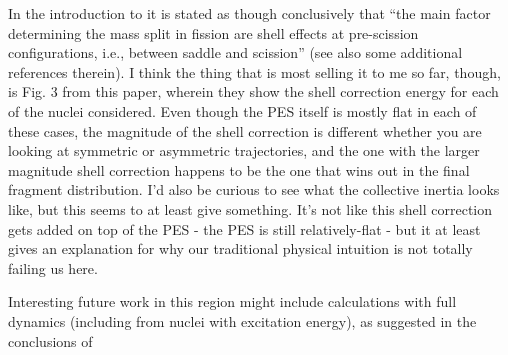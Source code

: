 In the introduction to \cite{Mcdonnell2014} it is stated as though conclusively that ``the main factor determining the mass split in fission are shell effects at pre-scission configurations, i.e., between saddle and scission'' (see also some additional references therein). I think the thing that is most selling it to me so far, though, is Fig. 3 from this paper, wherein they show the shell correction energy for each of the nuclei considered. Even though the PES itself is mostly flat in each of these cases, the magnitude of the shell correction is different whether you are looking at symmetric or asymmetric trajectories, and the one with the larger magnitude shell correction happens to be the one that wins out in the final fragment distribution. I'd also be curious to see what the collective inertia looks like, but this seems to at least give something. It's not like this shell correction gets added on top of the PES - the PES is still relatively-flat - but it at least gives an explanation for why our traditional physical intuition is not totally failing us here.

Interesting future work in this region might include calculations with full dynamics (including from nuclei with excitation energy), as suggested in the conclusions of \cite{Mcdonnell2014}






